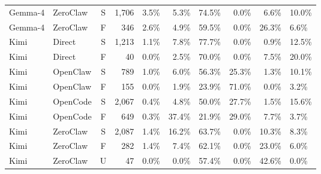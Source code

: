 \begin{table}[t]
\begin{tabular}{@{}llcrrrrrr@{}}
  Gemma-4 & ZeroClaw & S & 1,706 & 3.5\% & 5.3\% & 74.5\% & 0.0\% & 6.6\% & 10.0\% \\
  Gemma-4 & ZeroClaw & F & 346 & 2.6\% & 4.9\% & 59.5\% & 0.0\% & 26.3\% & 6.6\% \\
\midrule
  Kimi & Direct & S & 1,213 & 1.1\% & 7.8\% & 77.7\% & 0.0\% & 0.9\% & 12.5\% \\
  Kimi & Direct & F & 40 & 0.0\% & 2.5\% & 70.0\% & 0.0\% & 7.5\% & 20.0\% \\
  Kimi & OpenClaw & S & 789 & 1.0\% & 6.0\% & 56.3\% & 25.3\% & 1.3\% & 10.1\% \\
  Kimi & OpenClaw & F & 155 & 0.0\% & 1.9\% & 23.9\% & 71.0\% & 0.0\% & 3.2\% \\
  Kimi & OpenCode & S & 2,067 & 0.4\% & 4.8\% & 50.0\% & 27.7\% & 1.5\% & 15.6\% \\
  Kimi & OpenCode & F & 649 & 0.3\% & 37.4\% & 21.9\% & 29.0\% & 7.7\% & 3.7\% \\
  Kimi & ZeroClaw & S & 2,087 & 1.4\% & 16.2\% & 63.7\% & 0.0\% & 10.3\% & 8.3\% \\
  Kimi & ZeroClaw & F & 282 & 1.4\% & 7.4\% & 62.1\% & 0.0\% & 23.0\% & 6.0\% \\
  Kimi & ZeroClaw & U & 47 & 0.0\% & 0.0\% & 57.4\% & 0.0\% & 42.6\% & 0.0\% \\
\bottomrule
\end{tabular}
\vspace{-14pt}
\end{table}

